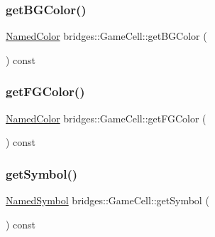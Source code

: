 \subsubsection{\texorpdfstring{get\+B\+G\+Color()}{getBGColor()}}
{\footnotesize\ttfamily \hyperlink{namespacebridges_ad811207d8898a7fd6b72a74725e68357}{Named\+Color} bridges\+::\+Game\+Cell\+::get\+B\+G\+Color (\begin{DoxyParamCaption}{ }\end{DoxyParamCaption}) const\hspace{0.3cm}{\ttfamily [inline]}}

\mbox{\label{classbridges_1_1_game_cell_af33d2a831608968e4c2dd53692aafac8}} 
\subsubsection{\texorpdfstring{get\+F\+G\+Color()}{getFGColor()}}
{\footnotesize\ttfamily \hyperlink{namespacebridges_ad811207d8898a7fd6b72a74725e68357}{Named\+Color} bridges\+::\+Game\+Cell\+::get\+F\+G\+Color (\begin{DoxyParamCaption}{ }\end{DoxyParamCaption}) const\hspace{0.3cm}{\ttfamily [inline]}}

\mbox{\label{classbridges_1_1_game_cell_af6bb157599096b8149a69b227414becb}} 
\subsubsection{\texorpdfstring{get\+Symbol()}{getSymbol()}}
{\footnotesize\ttfamily \hyperlink{namespacebridges_acfb0a4f7877d8f63de3e6862004c50ed}{Named\+Symbol} bridges\+::\+Game\+Cell\+::get\+Symbol (\begin{DoxyParamCaption}{ }\end{DoxyParamCaption}) const\hspace{0.3cm}{\ttfamily [inline]}}

\mbox{\label{classbridges_1_1_game_cell_a9fcc58283b9f6fb770f27ae30233afe6}} 
